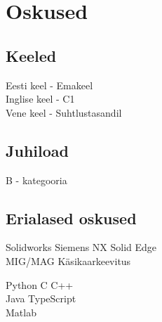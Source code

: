 \documentclass[letterpaper]{deedy-resume} %
\begin{document}
\begin{minipage}[t]{0.33\textwidth}

\section{Oskused}

\subsection{Keeled}

Eesti keel - Emakeel \\
Inglise keel - C1 \\
Vene keel - Suhtlustasandil \\

\sectionspace %


\subsection{Juhiload}

B - kategooria \\

\sectionspace %

\subsection{Erialased oskused}

\sectionspace

Solidworks \textbullet{} Siemens NX \textbullet{} Solid Edge\\
MIG/MAG \textbullet{} Käsikaarkeevitus \\

\sectionspace


\sectionspace

Python \textbullet{} C \textbullet{} C++ \\
Java \textbullet{} TypeScript \\
Matlab



\sectionspace %


\end{minipage} %
\end{document}
